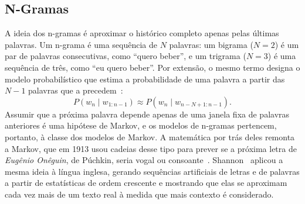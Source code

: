\subsection{N-Gramas} \label{sec:ngramas}

A ideia dos n-gramas é aproximar o histórico completo apenas pelas últimas palavras. Um n-grama é uma sequência de $N$ palavras: um bigrama ($N = 2$) é um par de palavras consecutivas, como ``quero beber'', e um trigrama ($N = 3$) é uma sequência de três, como ``eu quero beber''. Por extensão, o mesmo termo designa o modelo probabilístico que estima a probabilidade de uma palavra a partir das $N-1$ palavras que a precedem~\cite[cap.~3]{jurafsky2026slp}:
\begin{equation}
    P(w_n \mid w_{1:n-1}) \approx P(w_n \mid w_{n-N+1:n-1}).
    \label{eq:markov}
\end{equation}
Assumir que a próxima palavra depende apenas de uma janela fixa de palavras anteriores é uma hipótese de Markov, e os modelos de n-gramas pertencem, portanto, à classe dos modelos de Markov. A matemática por trás deles remonta a Markov, que em 1913 usou cadeias desse tipo para prever se a próxima letra de \textit{Eugênio Onêguin}, de Púchkin, seria vogal ou consoante~\cite[cap.~3]{jurafsky2026slp}. Shannon~\cite{shannon1948mathematical} aplicou a mesma ideia à língua inglesa, gerando sequências artificiais de letras e de palavras a partir de estatísticas de ordem crescente e mostrando que elas se aproximam cada vez mais de um texto real à medida que mais contexto é considerado.

